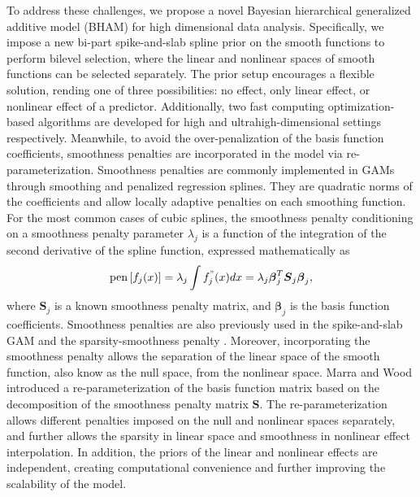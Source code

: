 \documentclass[AMA,STIX1COL,]{WileyNJD-v2}
\begin{document}
To address these challenges, we propose a novel Bayesian hierarchical
generalized additive model (BHAM) for high dimensional data analysis.
Specifically, we impose a new bi-part spike-and-slab spline prior on the
smooth functions to perform bilevel selection, where the linear and
nonlinear spaces of smooth functions can be selected separately. The
prior setup encourages a flexible solution, rending one of three
possibilities: no effect, only linear effect, or nonlinear effect of a
predictor. Additionally, two fast computing optimization-based
algorithms are developed for high and
ultrahigh-dimensional\citep{Fan2009} settings respectively. Meanwhile,
to avoid the over-penalization of the basis function coefficients,
smoothness penalties are incorporated in the model via
re-parameterization. Smoothness penalties are commonly implemented in
GAMs through smoothing and penalized regression splines. They are
quadratic norms of the coefficients and allow locally adaptive penalties
on each smoothing function. For the most common cases of cubic splines,
the smoothness penalty conditioning on a smoothness penalty parameter
\(\lambda_j\) is a function of the integration of the second derivative
of the spline function, expressed mathematically as
\begin{equation}\label{eq:smoothpen}
  \text{pen}\left[f_j(x)\right] = \lambda_j \int f^{"}_j(x)dx = \lambda_j \boldsymbol{\beta}_j^T \boldsymbol{S}_j \boldsymbol{\beta}_j ,
\end{equation} where \(\boldsymbol{S}_j\) is a known smoothness penalty
matrix, and \(\boldsymbol{\beta}_j\) is the basis function coefficients.
Smoothness penalties are also previously used in the spike-and-slab GAM
\citep{Scheipl2012} and the sparsity-smoothness penalty
\citep{Meier2009}. Moreover, incorporating the smoothness penalty allows
the separation of the linear space of the smooth function, also know as
the null space, from the nonlinear space. Marra and Wood
\citep{Marra2011} introduced a re-parameterization of the basis function
matrix based on the decomposition of the smoothness penalty matrix
\(\boldsymbol{S}\). The re-parameterization allows different penalties
imposed on the null and nonlinear spaces separately, and further allows
the sparsity in linear space and smoothness in nonlinear effect
interpolation. In addition, the priors of the linear and nonlinear
effects are independent, creating computational convenience and further
improving the scalability of the model.
\end{document}
